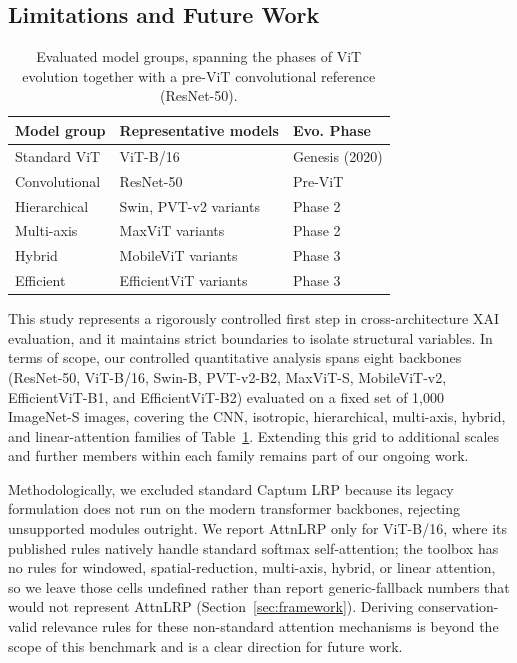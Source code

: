 \documentclass[final,5p,times,twocolumn]{elsarticle}
\begin{document}
\subsection{Limitations and Future Work}
\label{sec:limitations}

\begin{table}[t]
\centering
\caption{Evaluated model groups, spanning the phases of ViT evolution together with a pre-ViT convolutional reference (ResNet-50).}
\label{evaluated_models}
\begin{tabular}{lll}
\toprule
Model group & Representative models & Evo. Phase \\
\midrule
Standard ViT & ViT-B/16 & Genesis (2020) \\
Convolutional & ResNet-50 & Pre-ViT \\
Hierarchical & Swin, PVT-v2 variants & Phase 2 \\
Multi-axis & MaxViT variants & Phase 2 \\
Hybrid & MobileViT variants & Phase 3 \\
Efficient & EfficientViT variants & Phase 3 \\
\bottomrule
\end{tabular}
\end{table}

This study represents a rigorously controlled first step in cross-architecture XAI evaluation, and it maintains strict boundaries to isolate structural variables. In terms of scope, our controlled quantitative analysis spans eight backbones (ResNet-50, ViT-B/16, Swin-B, PVT-v2-B2, MaxViT-S, MobileViT-v2, EfficientViT-B1, and EfficientViT-B2) evaluated on a fixed set of 1,000 ImageNet-S images, covering the CNN, isotropic, hierarchical, multi-axis, hybrid, and linear-attention families of Table~\ref{evaluated_models}. Extending this grid to additional scales and further members within each family remains part of our ongoing work.

Methodologically, we excluded standard Captum LRP because its legacy formulation does not run on the modern transformer backbones, rejecting unsupported modules outright. We report AttnLRP only for ViT-B/16, where its published rules natively handle standard softmax self-attention; the toolbox has no rules for windowed, spatial-reduction, multi-axis, hybrid, or linear attention, so we leave those cells undefined rather than report generic-fallback numbers that would not represent AttnLRP (Section~\ref{sec:framework}). Deriving conservation-valid relevance rules for these non-standard attention mechanisms is beyond the scope of this benchmark and is a clear direction for future work.
\end{document}
